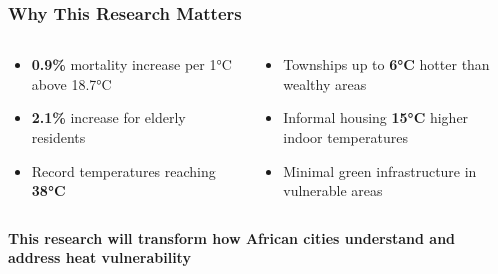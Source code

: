 \documentclass[aspectratio=169]{beamer}
\newcommand{\statistic}[1]{\textcolor{witsaccent}{\textbf{#1}}}
\begin{document}
\begin{frame}
    \frametitle{Why This Research Matters}
    
    \begin{center}
    \end{center}
    
    \vspace{0.3cm}
    \begin{columns}[T]
        \begin{column}{0.48\textwidth}
            \begin{infobox}
                \begin{itemize}[leftmargin=*, itemsep=6pt]
                    \item \statistic{0.9\%} mortality increase per 1°C above 18.7°C
                    \item \statistic{2.1\%} increase for elderly residents
                    \item Record temperatures reaching \statistic{38°C}
                \end{itemize}
            \end{infobox}
        \end{column}
        \begin{column}{0.48\textwidth}
            \begin{infobox}
                \begin{itemize}[leftmargin=*, itemsep=6pt]
                    \item Townships up to \statistic{6°C} hotter than wealthy areas
                    \item Informal housing \statistic{15°C} higher indoor temperatures
                    \item Minimal green infrastructure in vulnerable areas
                \end{itemize}
            \end{infobox}
        \end{column}
    \end{columns}
    
    \vspace{0.3cm}
    \begin{keypoint}
        \centering
        \textbf{This research will transform how African cities understand and address heat vulnerability}
    \end{keypoint}
\end{frame}
\end{document}
